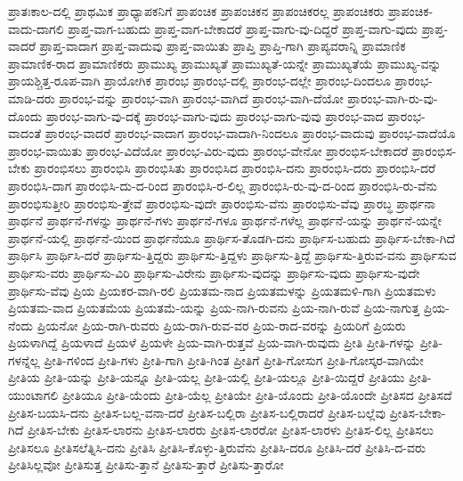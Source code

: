 {ಪ್ರಾತಃಕಾಲ-ದಲ್ಲಿ
ಪ್ರಾಥಮಿಕ
ಪ್ರಾಧ್ಯಾಪಕನಿಗೆ
ಪ್ರಾಪಂಚಿಕ
ಪ್ರಾಪಂಚಿಕನ
ಪ್ರಾಪಂಚಿಕರಲ್ಲ
ಪ್ರಾಪಂಚಿಕರು
ಪ್ರಾಪಂಚಿಕ-ವಾದು-ದಾಗಲಿ
ಪ್ರಾಪ್ತ-ವಾಗ-ಬಹುದು
ಪ್ರಾಪ್ತ-ವಾಗ-ಬೇಕಾದರೆ
ಪ್ರಾಪ್ತ-ವಾಗು-ವು-ದಿದ್ದರೆ
ಪ್ರಾಪ್ತ-ವಾಗು-ವುದು
ಪ್ರಾಪ್ತ-ವಾದರೆ
ಪ್ರಾಪ್ತ-ವಾದಾಗ
ಪ್ರಾಪ್ತ-ವಾದುವು
ಪ್ರಾಪ್ತ-ವಾಯಿತು
ಪ್ರಾಪ್ತಿ
ಪ್ರಾಪ್ತಿ-ಗಾಗಿ
ಪ್ರಾಪ್ಯವರಾನ್ನಿ
ಪ್ರಾಮಾಣಿಕ
ಪ್ರಾಮಾಣಿಕ-ರಾದ
ಪ್ರಾಮಾಣಿಕರು
ಪ್ರಾಮುಖ್ಯ
ಪ್ರಾಮುಖ್ಯತೆ
ಪ್ರಾಮುಖ್ಯತೆ-ಯನ್ನೇ
ಪ್ರಾಮುಖ್ಯತೆಯೆ
ಪ್ರಾಮುಖ್ಯ-ವನ್ನು
ಪ್ರಾಯಶ್ಚಿತ್ತ-ರೂಪ-ವಾಗಿ
ಪ್ರಾಯೋಗಿಕ
ಪ್ರಾರಂಭ
ಪ್ರಾರಂಭ-ದಲ್ಲಿ
ಪ್ರಾರಂಭ-ದಲ್ಲೇ
ಪ್ರಾರಂಭ-ದಿಂದಲೂ
ಪ್ರಾರಂಭ-ಮಾಡಿ-ದರು
ಪ್ರಾರಂಭ-ವನ್ನು
ಪ್ರಾರಂಭ-ವಾಗಿ
ಪ್ರಾರಂಭ-ವಾಗಿದೆ
ಪ್ರಾರಂಭ-ವಾಗಿ-ದೆಯೋ
ಪ್ರಾರಂಭ-ವಾಗಿ-ರು-ವು-ದೊಂದು
ಪ್ರಾರಂಭ-ವಾಗು-ವು-ದಕ್ಕೆ
ಪ್ರಾರಂಭ-ವಾಗು-ವುದು
ಪ್ರಾರಂಭ-ವಾಗು-ವುವು
ಪ್ರಾರಂಭ-ವಾದ
ಪ್ರಾರಂಭ-ವಾದಂತೆ
ಪ್ರಾರಂಭ-ವಾದರೆ
ಪ್ರಾರಂಭ-ವಾದಾಗ
ಪ್ರಾರಂಭ-ವಾದಾಗಿ-ನಿಂದಲೂ
ಪ್ರಾರಂಭ-ವಾದುವು
ಪ್ರಾರಂಭ-ವಾದೆಯೊ
ಪ್ರಾರಂಭ-ವಾಯಿತು
ಪ್ರಾರಂಭ-ವಿದೆಯೋ
ಪ್ರಾರಂಭ-ವಿರು-ವುದು
ಪ್ರಾರಂಭ-ವೇನೋ
ಪ್ರಾರಂಭಿಸ-ಬೇಕಾದರೆ
ಪ್ರಾರಂಭಿಸ-ಬೇಕು
ಪ್ರಾರಂಭಿಸಲು
ಪ್ರಾರಂಭಿಸಿ
ಪ್ರಾರಂಭಿಸಿತು
ಪ್ರಾರಂಭಿಸಿದ
ಪ್ರಾರಂಭಿಸಿ-ದನು
ಪ್ರಾರಂಭಿಸಿ-ದರು
ಪ್ರಾರಂಭಿಸಿ-ದರೆ
ಪ್ರಾರಂಭಿಸಿ-ದಾಗ
ಪ್ರಾರಂಭಿಸಿ-ದು-ದ-ರಿಂದ
ಪ್ರಾರಂಭಿಸಿ-ರ-ಲಿಲ್ಲ
ಪ್ರಾರಂಭಿಸಿ-ರು-ವು-ದ-ರಿಂದ
ಪ್ರಾರಂಭಿಸಿ-ರು-ವೆನು
ಪ್ರಾರಂಭಿಸುತ್ತೀರಿ
ಪ್ರಾರಂಭಿಸು-ತ್ತೇವೆ
ಪ್ರಾರಂಭಿಸು-ವುದೇ
ಪ್ರಾರಂಭಿಸು-ವೆನು
ಪ್ರಾರಂಭಿಸು-ವೆವು
ಪ್ರಾರಬ್ಧ
ಪ್ರಾರ್ಥನಾ
ಪ್ರಾರ್ಥನೆ
ಪ್ರಾರ್ಥನೆ-ಗಳನ್ನು
ಪ್ರಾರ್ಥನೆ-ಗಳು
ಪ್ರಾರ್ಥನೆ-ಗಳೂ
ಪ್ರಾರ್ಥನೆ-ಗಳೆಲ್ಲ
ಪ್ರಾರ್ಥನೆ-ಯನ್ನು
ಪ್ರಾರ್ಥನೆ-ಯನ್ನೇ
ಪ್ರಾರ್ಥನೆ-ಯಲ್ಲಿ
ಪ್ರಾರ್ಥನೆ-ಯಿಂದ
ಪ್ರಾರ್ಥನೆಯೂ
ಪ್ರಾರ್ಥಿಸ-ತೊಡಗಿ-ದನು
ಪ್ರಾರ್ಥಿಸ-ಬಹುದು
ಪ್ರಾರ್ಥಿಸ-ಬೇಕಾ-ಗಿದೆ
ಪ್ರಾರ್ಥಿಸಿ
ಪ್ರಾರ್ಥಿಸಿ-ದರೆ
ಪ್ರಾರ್ಥಿಸು-ತ್ತಿದ್ದರು
ಪ್ರಾರ್ಥಿಸು-ತ್ತಿದ್ದಳು
ಪ್ರಾರ್ಥಿಸು-ತ್ತಿದ್ದೆ
ಪ್ರಾರ್ಥಿಸು-ತ್ತಿರುವ-ವನು
ಪ್ರಾರ್ಥಿಸುವ
ಪ್ರಾರ್ಥಿಸು-ವರು
ಪ್ರಾರ್ಥಿಸು-ವಿರಿ
ಪ್ರಾರ್ಥಿಸು-ವಿರೇನು
ಪ್ರಾರ್ಥಿಸು-ವುದನ್ನು
ಪ್ರಾರ್ಥಿಸು-ವುದು
ಪ್ರಾರ್ಥಿಸು-ವುದೇ
ಪ್ರಾರ್ಥಿಸು-ವೆವು
ಪ್ರಿಯ
ಪ್ರಿಯಕರ-ವಾಗಿ-ರಲಿ
ಪ್ರಿಯತಮ-ನಾದ
ಪ್ರಿಯತಮಳನ್ನು
ಪ್ರಿಯತಮಳಿ-ಗಾಗಿ
ಪ್ರಿಯತಮಳು
ಪ್ರಿಯತಮ-ವಾದ
ಪ್ರಿಯತಮೆಯ
ಪ್ರಿಯತಮೆ-ಯನ್ನು
ಪ್ರಿಯ-ನಾಗಿ-ರುವನು
ಪ್ರಿಯ-ನಾಗಿ-ರುವೆ
ಪ್ರಿಯ-ನಾಗುತ್ತ
ಪ್ರಿಯ-ನೆಂದು
ಪ್ರಿಯನೋ
ಪ್ರಿಯ-ರಾಗಿ-ರುವರು
ಪ್ರಿಯ-ರಾಗಿ-ರುವ-ವರ
ಪ್ರಿಯ-ರಾದ-ವರನ್ನು
ಪ್ರಿಯರಿಗೆ
ಪ್ರಿಯರು
ಪ್ರಿಯಳಾಗಿದ್ದೆ
ಪ್ರಿಯಳಾದೆ
ಪ್ರಿಯಳೆ
ಪ್ರಿಯಳೇ
ಪ್ರಿಯ-ವಾಗಿ-ರುತ್ತವೆ
ಪ್ರಿಯ-ವಾಗಿ-ರುವುದು
ಪ್ರೀತಿ
ಪ್ರೀತಿ-ಗಳನ್ನು
ಪ್ರೀತಿ-ಗಳನ್ನೆಲ್ಲ
ಪ್ರೀತಿ-ಗಳಿಂದ
ಪ್ರೀತಿ-ಗಳು
ಪ್ರೀತಿ-ಗಾಗಿ
ಪ್ರೀತಿ-ಗಿಂತ
ಪ್ರೀತಿಗೆ
ಪ್ರೀತಿ-ಗೋಸುಗ
ಪ್ರೀತಿ-ಗೋಸ್ಕರ-ವಾಗಿಯೇ
ಪ್ರೀತಿಯ
ಪ್ರೀತಿ-ಯನ್ನು
ಪ್ರೀತಿ-ಯನ್ನೂ
ಪ್ರೀತಿ-ಯಲ್ಲ
ಪ್ರೀತಿ-ಯಲ್ಲಿ
ಪ್ರೀತಿ-ಯಲ್ಲೂ
ಪ್ರೀತಿ-ಯಿದ್ದರೆ
ಪ್ರೀತಿಯು
ಪ್ರೀತಿ-ಯುಂಟಾಗಲಿ
ಪ್ರೀತಿಯೂ
ಪ್ರೀತಿ-ಯೆಂದು
ಪ್ರೀತಿ-ಯೆಲ್ಲ
ಪ್ರೀತಿಯೇ
ಪ್ರೀತಿ-ಯೊಂದು
ಪ್ರೀತಿ-ಯೊಂದೇ
ಪ್ರೀತಿಸದ
ಪ್ರೀತಿಸದೆ
ಪ್ರೀತಿಸ-ಬಯಸಿ-ದನು
ಪ್ರೀತಿಸ-ಬಲ್ಲ-ವನಾ-ದರೆ
ಪ್ರೀತಿಸ-ಬಲ್ಲಿರಾ
ಪ್ರೀತಿಸ-ಬಲ್ಲಿರಾದರೆ
ಪ್ರೀತಿಸ-ಬಲ್ಲೆವು
ಪ್ರೀತಿಸ-ಬೇಕಾ-ಗಿದೆ
ಪ್ರೀತಿಸ-ಬೇಕು
ಪ್ರೀತಿಸ-ಲಾರನು
ಪ್ರೀತಿಸ-ಲಾರರು
ಪ್ರೀತಿಸ-ಲಾರರೋ
ಪ್ರೀತಿಸ-ಲಾರಳು
ಪ್ರೀತಿಸ-ಲಿಲ್ಲ
ಪ್ರೀತಿಸಲು
ಪ್ರೀತಿಸಲೂ
ಪ್ರೀತಿಸಲೆತ್ನಿಸಿ-ದನು
ಪ್ರೀತಿಸಿ
ಪ್ರೀತಿಸಿ-ಕೊಳ್ಳು-ತ್ತಿರುವೆನು
ಪ್ರೀತಿಸಿ-ದರೂ
ಪ್ರೀತಿಸಿ-ದರೆ
ಪ್ರೀತಿಸಿ-ದ-ವರು
ಪ್ರೀತಿಸಿಲ್ಲವೋ
ಪ್ರೀತಿಸುತ್ತ
ಪ್ರೀತಿಸು-ತ್ತಾನೆ
ಪ್ರೀತಿಸು-ತ್ತಾರೆ
ಪ್ರೀತಿಸು-ತ್ತಾರೋ
}
